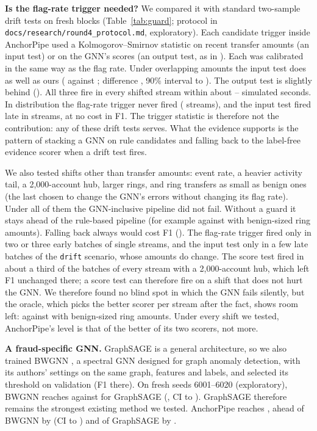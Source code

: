 
\textbf{Is the flag-rate trigger needed?} We compared it with standard
two-sample drift tests on fresh blocks (Table~\ref{tab:guard}; protocol in
\texttt{docs/research/round4\_protocol.md}, exploratory). Each candidate trigger
inside AnchorPipe used a Kolmogorov--Smirnov statistic on recent transfer
amounts (an input test) or on the GNN's scores (an output test, as in
\cite{rabanser2019failing}). Each was calibrated in the same way as the flag
rate. Under overlapping amounts the input test does as well as ours
(\GdOnetrigamountF{} against \GdOnetrigflagF{}; difference \GdFlagAmountD{}, 90\%
interval \GdFlagAmountLoNinety{} to \GdFlagAmountHiNinety{}). The output test is
slightly behind (\GdFlagScoreD{}). All three fire in every shifted stream within
about \GdDelayflag{}--\GdDelayscore{} simulated seconds. In distribution the
flag-rate trigger never fired (\GdZeroflagFired{} streams), and the input test
fired late in \GdZeroamountFired{} streams, at no cost in F1. The trigger statistic
is therefore not the contribution: any of these drift tests serves. What the
evidence supports is the pattern of stacking a GNN on rule candidates and falling
back to the label-free evidence scorer when a drift test fires.

We also tested shifts other than transfer amounts: event rate, a heavier
activity tail, a 2{,}000-account hub, larger rings, and ring transfers as small
as benign ones (the last chosen to change the GNN's errors without changing its
flag rate). Under all of them the GNN-inclusive pipeline did not fail. Without a
guard it stays ahead of the rule-based pipeline (for example \GdSixtrigneverF{}
against \GdSixproposedF{} with benign-sized ring amounts). Falling back always
would cost F1 (\GdSixtrigalwaysF{}). The flag-rate trigger fired only in two or
three early batches of single streams, and the input test only in a few late
batches of the \texttt{drift} scenario, whose amounts do change. The score test fired in about a third of
the batches of every stream with a 2{,}000-account hub, which left F1 unchanged
there; a score test can therefore fire on a shift that does not hurt the GNN. We therefore found no blind spot in which the GNN fails
silently, but the oracle, which picks the better scorer per stream after the fact,
shows room left: \GdSixoracleF{} against \GdSixtrigflagF{} with benign-sized ring
amounts. Under every shift we tested, AnchorPipe's level is that of the better of
its two scorers, not more.

\textbf{A fraud-specific GNN.} GraphSAGE is a general architecture, so we also
trained BWGNN \cite{tang2022bwgnn}, a spectral GNN designed for graph anomaly
detection, with its authors' settings on the same graph, features and labels,
and selected its threshold on validation (F1 \BwValF{} there). On fresh seeds
6001--6020 (exploratory), BWGNN reaches \BwFbwgnn{} against \BwFgnnunscored{} for
GraphSAGE (\BwBwSageD{}, CI \BwBwSageLo{} to \BwBwSageHi{}). GraphSAGE therefore
remains the strongest existing method we tested. AnchorPipe reaches \BwFanchor{}, ahead of
BWGNN by \BwAnchorBwD{} (CI \BwAnchorBwLo{} to \BwAnchorBwHi{}) and of GraphSAGE by
\BwAnchorSageD{}.

